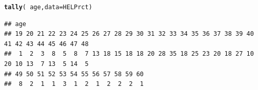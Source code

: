 \documentclass[twoside]{book}\usepackage[]{graphicx}\usepackage[]{xcolor}
\makeatletter
\newcommand{\hlopt}[1]{\textcolor[rgb]{0,0,0}{#1}}%
\newcommand{\hlstd}[1]{\textcolor[rgb]{0.345,0.345,0.345}{#1}}%
\newcommand{\hlkwc}[1]{\textcolor[rgb]{0.333,0.667,0.333}{#1}}%
\newcommand{\hlkwd}[1]{\textcolor[rgb]{0.737,0.353,0.396}{\textbf{#1}}}%
\newenvironment{kframe}{%
 \def\at@end@of@kframe{}%
 \ifinner\ifhmode%
  \def\at@end@of@kframe{\end{minipage}}%
  \begin{minipage}{\columnwidth}%
 \fi\fi%
 \def\FrameCommand##1{\hskip\@totalleftmargin \hskip-\fboxsep
 \colorbox{shadecolor}{##1}\hskip-\fboxsep
     \hskip-\linewidth \hskip-\@totalleftmargin \hskip\columnwidth}%
 \MakeFramed {\advance\hsize-\width
   \@totalleftmargin\z@ \linewidth\hsize
   \@setminipage}}%
 {\par\unskip\endMakeFramed%
 \at@end@of@kframe}
\newenvironment{knitrout}{}{} %
\makeatother
\begin{document}
\begin{knitrout}
\color{fgcolor}\begin{kframe}
\begin{alltt}
\hlkwd{tally}\hlstd{(} \hlopt{~}\hlstd{age,} \hlkwc{data}\hlstd{=HELPrct )}
\end{alltt}
\begin{verbatim}
## age
## 19 20 21 22 23 24 25 26 27 28 29 30 31 32 33 34 35 36 37 38 39 40 41 42 43 44 45 46 47 48 
##  1  2  3  8  5  8  7 13 18 15 18 18 20 28 35 18 25 23 20 18 27 10 20 10 13  7 13  5 14  5 
## 49 50 51 52 53 54 55 56 57 58 59 60 
##  8  2  1  1  3  1  2  1  2  2  2  1
\end{verbatim}
\end{kframe}
\end{knitrout}
\end{document}
